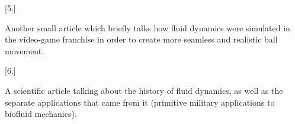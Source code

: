 \documentclass[12pt]{article}
\begin{document}
[5.] \parencite{fifa_air_resistance} \par Another small article which briefly talks how fluid dynamics were simulated in the video-game franchise
 in order to create more seamless and realistic ball movement.

[6.] \parencite{fluid_dynamic_workings} \par A scientific article talking about the history of fluid dynamics, as well as the separate applications
that came from it (primitive military applications to biofluid mechanics). 


\printbibliography
\end{document}
